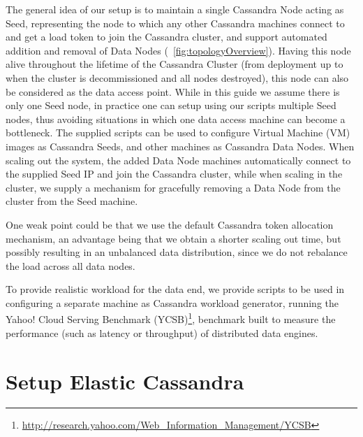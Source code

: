 \documentclass[10pt]{report}
\begin{document}
The general idea of our setup is to maintain a single Cassandra Node acting as Seed, representing the node to which any other Cassandra machines connect to and get a load token to join the Cassandra cluster, and support automated addition and removal of Data Nodes (\figurename~\ref{fig:topologyOverview}). Having this node alive throughout the lifetime of the Cassandra Cluster (from deployment up to when the cluster is decommissioned and all nodes destroyed), this node can also be considered as the data access point. While in this guide we assume there is only one Seed node, in practice one can setup using our scripts multiple Seed nodes, thus avoiding situations in which one data access machine can become a bottleneck. The supplied scripts can be used to configure Virtual Machine (VM) images as Cassandra Seeds, and other machines as Cassandra Data Nodes. When scaling out the system, the added Data Node machines automatically connect to the supplied Seed IP and join the Cassandra cluster, while when scaling in the cluster, we supply a mechanism for gracefully removing a Data Node from the cluster from the Seed machine.

One weak point could be that we use the default Cassandra token allocation mechanism, an advantage being that we obtain a shorter scaling out time, but possibly resulting in an unbalanced data distribution, since we do not rebalance the load across all data nodes. 

 To provide realistic workload for the data end, we provide scripts to be used in configuring a separate machine as Cassandra workload generator, running the Yahoo! Cloud Serving Benchmark (YCSB)\footnote{\url{http://research.yahoo.com/Web_Information_Management/YCSB}}, benchmark built to measure the performance (such as latency or throughput) of distributed data engines.


\section{Setup Elastic Cassandra}
\end{document}

